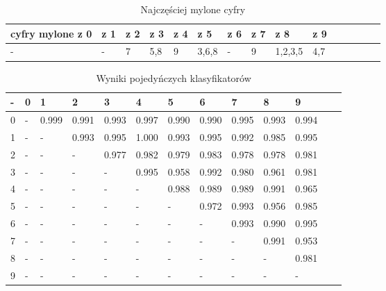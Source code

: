 \documentclass[a4paper]{article}
\begin{document}
\begin{table}[H]
    \caption{ Najczęściej mylone cyfry
    \label{table:confObservation}
    }
\begin{center}
    \begin{tabular}{| l | l | l | l | l | l | l | l | l | l | l | l | l | l | l |}
    \hline
        cyfry mylone z 0 & z 1 & z 2 & z 3 & z 4 & z 5 & z 6 & z 7 & z 8 & z 9 \\
    \hline
        -     &%
        -     &%
        7     &%
        5,8   &%
        9     &%
        3,6,8 &%
        -     &%
        9     &%
        1,2,3,5  &%
        4,7   \\%
    \hline
    \end{tabular}
\end{center}
\end{table}


\begin{table}[H]
    \caption{Wyniki pojedyńczych klasyfikatorów
    \label{table:indiv}
    }
\begin{center}
    \begin{tabular}{| l | l | l | l | l | l | l | l | l | l | l | l | l |}
    \hline
        - & 0 & 1 & 2 & 3 & 4 & 5 & 6 & 7 & 8 & 9 \\
    \hline
 0 &  -     & 0.999 & 0.991 & 0.993 & 0.997 & 0.990 & 0.990 & 0.995 & 0.993 & 0.994 \\
 1 &  -     & -     & 0.993 & 0.995 & 1.000 & 0.993 & 0.995 & 0.992 & 0.985 & 0.995 \\
 2 &  -     & -     & -     & 0.977 & 0.982 & 0.979 & 0.983 & 0.978 & 0.978 & 0.981 \\
 3 &  -     & -     & -     & -     & 0.995 & 0.958 & 0.992 & 0.980 & 0.961 & 0.981 \\
 4 &  -     & -     & -     & -     & -     & 0.988 & 0.989 & 0.989 & 0.991 & 0.965 \\
 5 &  -     & -     & -     & -     & -     & -     & 0.972 & 0.993 & 0.956 & 0.985 \\
 6 &  -     & -     & -     & -     & -     & -     & -     & 0.993 & 0.990 & 0.995 \\
 7 &  -     & -     & -     & -     & -     & -     & -     & -     & 0.991 & 0.953 \\
 8 &  -     & -     & -     & -     & -     & -     & -     & -     & -     & 0.981 \\
 9 &  -     & -     & -     & -     & -     & -     & -     & -     & -     & -     \\
    \hline
    \end{tabular}
\end{center}
\end{table}
\end{document}
